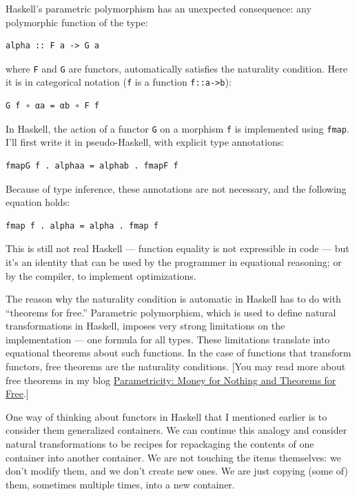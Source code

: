 Haskell's parametric polymorphism has an unexpected consequence: any
polymorphic function of the type:

\begin{verbatim}
alpha :: F a -> G a
\end{verbatim}

where \texttt{F} and \texttt{G} are functors, automatically satisfies
the naturality condition. Here it is in categorical notation (\texttt{f}
is a function \texttt{f::a-\textgreater{}b}):

\begin{verbatim}
G f ∘ αa = αb ∘ F f
\end{verbatim}

In Haskell, the action of a functor \texttt{G} on a morphism \texttt{f}
is implemented using \texttt{fmap}. I'll first write it in
pseudo-Haskell, with explicit type annotations:

\begin{verbatim}
fmapG f . alphaa = alphab . fmapF f
\end{verbatim}

Because of type inference, these annotations are not necessary, and the
following equation holds:

\begin{verbatim}
fmap f . alpha = alpha . fmap f
\end{verbatim}

This is still not real Haskell --- function equality is not expressible
in code --- but it's an identity that can be used by the programmer in
equational reasoning; or by the compiler, to implement optimizations.

The reason why the naturality condition is automatic in Haskell has to
do with ``theorems for free.'' Parametric polymorphism, which is used to
define natural transformations in Haskell, imposes very strong
limitations on the implementation --- one formula for all types. These
limitations translate into equational theorems about such functions. In
the case of functions that transform functors, free theorems are the
naturality conditions. {[}You may read more about free theorems in my
blog
\href{https://bartoszmilewski.com/2014/09/22/parametricity-money-for-nothing-and-theorems-for-free/}{Parametricity:
Money for Nothing and Theorems for Free}.{]}

One way of thinking about functors in Haskell that I mentioned earlier
is to consider them generalized containers. We can continue this analogy
and consider natural transformations to be recipes for repackaging the
contents of one container into another container. We are not touching
the items themselves: we don't modify them, and we don't create new
ones. We are just copying (some of) them, sometimes multiple times, into
a new container.

